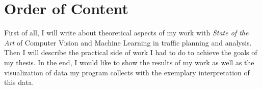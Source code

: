 \section{Order of Content}
\label{sec:orderOfContent}
First of all, I will write about theoretical aspects of my work with \textit{State of the Art} of Computer Vision and Machine Learning in traffic planning and analysis. Then I will describe the practical side of work I had to do to achieve the goals of my thesis. In the end, I would like to show the results of my work as well as the visualization of data my program collects with the exemplary interpretation of this data. 














